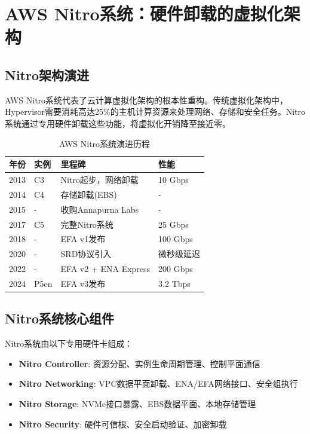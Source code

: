 
\section{AWS Nitro系统：硬件卸载的虚拟化架构}

\subsection{Nitro架构演进}

AWS Nitro系统代表了云计算虚拟化架构的根本性重构。传统虚拟化架构中，Hypervisor需要消耗高达25\%的主机计算资源来处理网络、存储和安全任务。Nitro系统通过专用硬件卸载这些功能，将虚拟化开销降至接近零。

\begin{table}[htbp]
\centering
\caption{AWS Nitro系统演进历程}
\begin{tabular}{@{}llll@{}}
\toprule
\textbf{年份} & \textbf{实例} & \textbf{里程碑} & \textbf{性能} \\
\midrule
2013 & C3 & Nitro起步，网络卸载 & 10 Gbps \\
2014 & C4 & 存储卸载(EBS) & - \\
2015 & - & 收购Annapurna Labs & - \\
2017 & C5 & 完整Nitro系统 & 25 Gbps \\
2018 & - & EFA v1发布 & 100 Gbps \\
2020 & - & SRD协议引入 & 微秒级延迟 \\
2022 & - & EFA v2 + ENA Express & 200 Gbps \\
2024 & P5en & EFA v3发布 & 3.2 Tbps \\
\bottomrule
\end{tabular}
\end{table}

\subsection{Nitro系统核心组件}

Nitro系统由以下专用硬件卡组成：

\begin{itemize}
    \item \textbf{Nitro Controller}: 资源分配、实例生命周期管理、控制平面通信
    \item \textbf{Nitro Networking}: VPC数据平面卸载、ENA/EFA网络接口、安全组执行
    \item \textbf{Nitro Storage}: NVMe接口暴露、EBS数据平面、本地存储管理
    \item \textbf{Nitro Security}: 硬件可信根、安全启动验证、加密卸载
\end{itemize}

